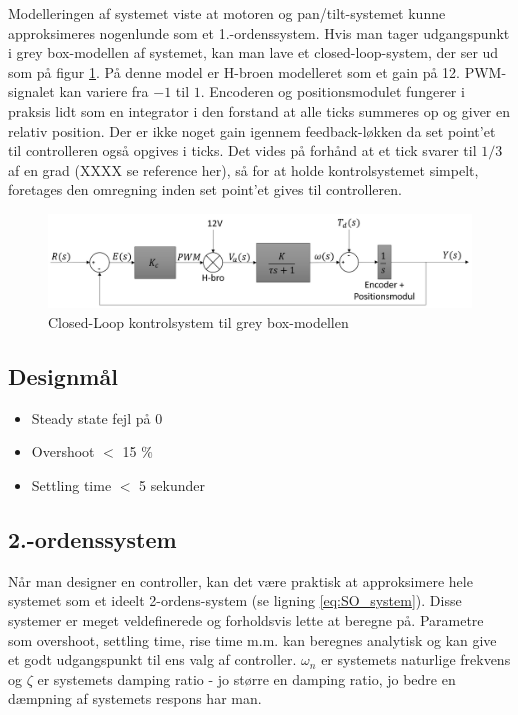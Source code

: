 Modelleringen af systemet viste at motoren og pan/tilt-systemet kunne approksimeres nogenlunde som et 1.-ordenssystem.
Hvis man tager udgangspunkt i grey box-modellen af systemet, kan man lave et closed-loop-system, der ser ud som på figur \ref{fig:BB_Model}. På denne model er H-broen modelleret som et gain på 12. PWM-signalet kan variere fra $-1$ til $1$. Encoderen og positionsmodulet fungerer i praksis lidt som en integrator i den forstand at alle ticks summeres op og giver en relativ position. Der er ikke noget gain igennem feedback-løkken da set point'et til controlleren også opgives i ticks. Det vides på forhånd at et tick svarer til $1/3$ af en grad (XXXX se reference her), så for at holde kontrolsystemet simpelt, foretages den omregning inden set point'et gives til controlleren.

\begin{figure}[ht]
	\begin{center}
		\includegraphics[scale=0.5]{Billeder/Control_Loop.PNG}
	\end{center}
\caption{Closed-Loop kontrolsystem til grey box-modellen}
\label{fig:BB_Model}
\end{figure}

\subsection{Designmål}

\begin{itemize}

\item Steady state fejl på 0
\item Overshoot $<$ 15 $\%$
\item Settling time $<$ 5 sekunder

\end{itemize}

\subsection{2.-ordenssystem}

Når man designer en controller, kan det være praktisk at approksimere hele systemet som et ideelt 2-ordens-system (se ligning \ref{eq:SO_system}). Disse systemer er meget veldefinerede og forholdsvis lette at beregne på. Parametre som overshoot, settling time, rise time m.m. kan beregnes analytisk og kan give et godt udgangspunkt til ens valg af controller. $\omega_{n}$ er systemets naturlige frekvens og $\zeta$ er systemets damping ratio - jo større en damping ratio, jo bedre en dæmpning af systemets respons har man.

